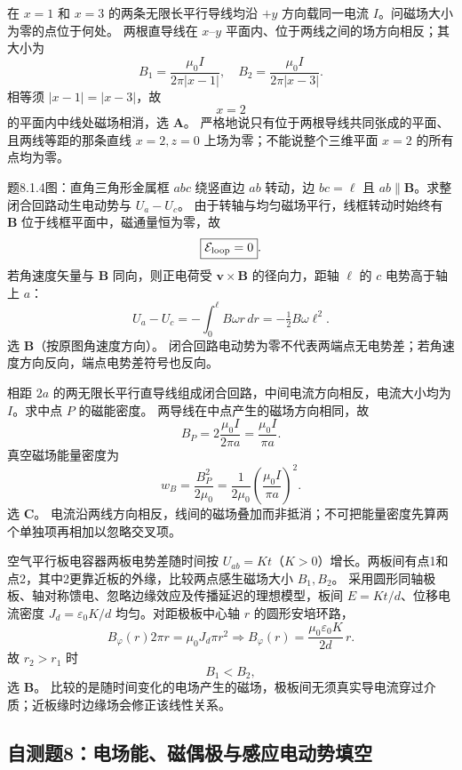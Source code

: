 \problemtext 在 $x=1$ 和 $x=3$ 的两条无限长平行导线均沿 $+y$ 方向载同一电流 $I$。问磁场大小为零的点位于何处。
\workings 两根直导线在 $x$--$y$ 平面内、位于两线之间的场方向相反；其大小为
\[B_1=\frac{\mu_0I}{2\pi|x-1|},\quad
B_2=\frac{\mu_0I}{2\pi|x-3|}.\]
相等须 $|x-1|=|x-3|$，故
\[\boxed{x=2}\]
的平面内中线处磁场相消，选 \textbf{A}。
\crosscheck 严格地说只有位于两根导线共同张成的平面、且两线等距的那条直线 $x=2,z=0$ 上场为零；不能说整个三维平面 $x=2$ 的所有点均为零。

\problemtext 题8.1.4图：直角三角形金属框 $abc$ 绕竖直边 $ab$ 转动，边 $bc=\ell$ 且 $ab\parallel\bm B$。求整闭合回路动生电动势与 $U_a-U_c$。
\workings 由于转轴与均匀磁场平行，线框转动时始终有 $\bm B$ 位于线框平面中，磁通量恒为零，故
\[\boxed{\mathcal E_{\rm loop}=0}.\]
若角速度矢量与 $\bm B$ 同向，则正电荷受 $\bm v\times\bm B$ 的径向力，距轴 $\ell$ 的 $c$ 电势高于轴上 $a$：
\[\boxed{U_a-U_c=-\int_0^\ell B\omega r\,dr=-\tfrac12B\omega\ell^2}.\]
选 \textbf{B}（按原图角速度方向）。
\crosscheck 闭合回路电动势为零不代表两端点无电势差；若角速度方向反向，端点电势差符号也反向。

\problemtext 相距 $2a$ 的两无限长平行直导线组成闭合回路，中间电流方向相反，电流大小均为 $I$。求中点 $P$ 的磁能密度。
\workings 两导线在中点产生的磁场方向相同，故
\[B_P=2\frac{\mu_0I}{2\pi a}=\frac{\mu_0I}{\pi a}.\]
真空磁场能量密度为
\[\boxed{w_B=\frac{B_P^2}{2\mu_0}
=\frac1{2\mu_0}\left(\frac{\mu_0I}{\pi a}\right)^2}.\]
选 \textbf{C}。
\crosscheck 电流沿两线方向相反，线间的磁场叠加而非抵消；不可把能量密度先算两个单独项再相加以忽略交叉项。

\problemtext 空气平行板电容器两板电势差随时间按 $U_{ab}=Kt$（$K>0$）增长。两板间有点1和点2，其中2更靠近板的外缘，比较两点感生磁场大小 $B_1,B_2$。
\workings 采用圆形同轴极板、轴对称馈电、忽略边缘效应及传播延迟的理想模型，板间 $E=Kt/d$、位移电流密度 $J_d=\varepsilon_0K/d$ 均匀。对距极板中心轴 $r$ 的圆形安培环路，
\[B_\varphi(r)2\pi r=\mu_0J_d\pi r^2
\Longrightarrow\boxed{B_\varphi(r)=\frac{\mu_0\varepsilon_0 K}{2d}\,r}.\]
故 $r_2>r_1$ 时
\[\boxed{B_1<B_2},\]
选 \textbf{B}。
\crosscheck 比较的是随时间变化的电场产生的磁场，极板间无须真实导电流穿过介质；近板缘时边缘场会修正该线性关系。

\subsection{自测题8：电场能、磁偶极与感应电动势填空}

